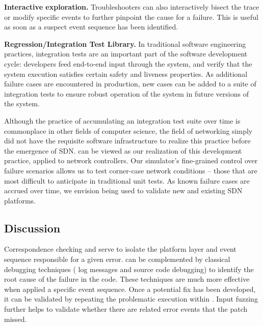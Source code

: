 {\noindent\textbf{Interactive exploration.} Troubleshooters can also interactively bisect
the trace or modify specific events to further pinpoint the cause for a failure.
This is useful as soon as a suspect event sequence has been identified.

\noindent\textbf{Regression/Integration Test Library.} In traditional software engineering practices,
integration tests are an
important part of the software development cycle: developers feed end-to-end
input through the system, and verify that the system execution satisfies
certain safety and liveness properties. As additional failure cases are encountered in
production, new cases can be added to a suite of integration tests to
ensure robust operation of the system in future versions of the system.

Although the practice of accumulating an integration test suite over time is
commonplace in other fields of computer science, the field of networking
simply did not have the requisite software infrastructure to realize this practice before the emergence
of SDN. \Simulator{} can be viewed as our realization
of this development practice, applied to network controllers. Our simulator's fine-grained control over
failure scenarios allows us to test corner-case network conditions -- those
that are most difficult to anticipate in traditional unit tests.
As known failure cases are accrued over time, we envision \simulator{} being used to validate
new and existing SDN platforms.

\subsection{Discussion}

Correspondence checking and \simulator{} serve to isolate the platform layer and
event sequence responsible for a given error. \projectname{} can be
complemented by classical debugging techniques (\eg{} log messages and source
code debugging) to identify the root cause of
the failure in the code. These techniques are much more
effective when applied a specific event sequence. Once a
potential fix has been developed, it can be validated by repeating the
problematic execution within \projectname{}. Input fuzzing further helps to
validate whether there are
related error events that the patch missed.

} %

